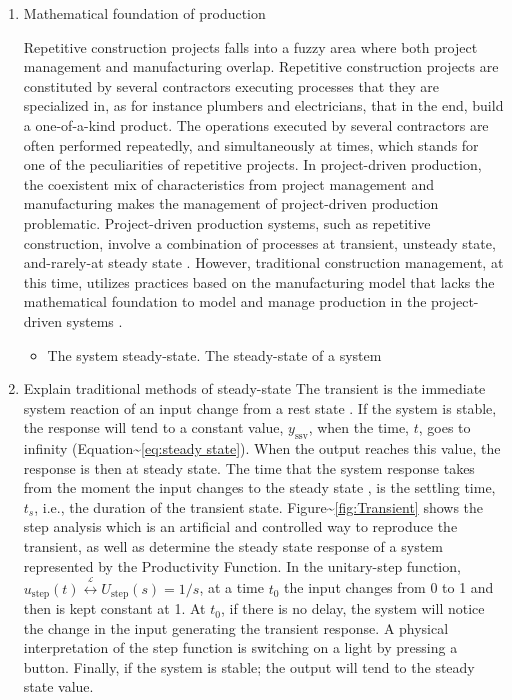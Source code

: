 \documentclass{article}
\begin{document}
\begin{enumerate}
\item Mathematical foundation of production
\label{sec:org04b1e88}

Repetitive construction projects falls into a fuzzy area where both project management and manufacturing overlap.
Repetitive construction projects are constituted by several contractors executing processes that they are specialized in, as for instance plumbers and electricians, that in the end, build a one-of-a-kind product.
The operations executed by several contractors are often performed repeatedly, and simultaneously at times, which stands for one of the peculiarities of repetitive projects.
In project-driven production, the coexistent mix of characteristics from project management and manufacturing makes the management of project-driven production problematic.
Project-driven production systems, such as repetitive construction, involve a combination of processes at transient, unsteady state, and-rarely-at steady state \citep{Antunes2015a,Antunes2015,Bashford2005,Walsh2007}.
However, traditional construction management, at this time, utilizes practices based on the manufacturing model that lacks the mathematical foundation to model and manage production in the project-driven systems \citep{Bertelsen2003,McCray2002,Pereira2013,Ko2016}.

\begin{itemize}
\item The system steady-state.
The steady-state of a system
\end{itemize}

\item Explain traditional methods of steady-state
\label{sec:orgc8ddbb2}
The transient is the immediate system reaction of an input change from a rest state \citep{Ogata2010}.
If the system is stable, the response will tend to a constant value, \(y_{\mbox{ssv}}\), when the time, \(t\), goes to infinity (Equation\textasciitilde{}\ref{eq:steady state}).
When the output reaches this value, the response is then at steady state.
The time that the system response takes from the moment the input changes to the steady state \citep{Nise2010,Ogata2010}, is the settling time, \(t_s\), i.e., the duration of the transient state.
Figure\textasciitilde{}\ref{fig:Transient} shows the step analysis which is an artificial and controlled way to reproduce the transient, as well as determine the steady state response of a system represented by the Productivity Function.
In the unitary-step function, \(u_{\mbox{step}}(t) \overset{\underset{\mathrm{\mathcal{L}}}{}}{\leftrightarrow} U_{\mbox{step}}(s) = 1/s\), at a time \(t_0\) the input changes from 0 to 1 and then is kept constant at 1.
At \(t_0\), if there is no delay, the system will notice the change in the input generating the transient response.
A physical interpretation of the step function is switching on a light by pressing a button.
Finally, if the system is stable; the output will tend to the steady state value.


\end{enumerate}
\end{document}
